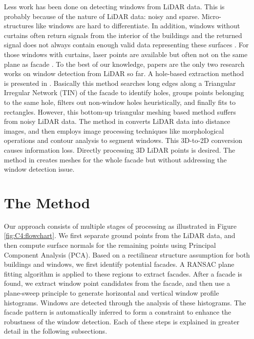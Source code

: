 Less work has been done on detecting windows from LiDAR data. This is probably because of the nature of LiDAR data: noisy and sparse. Micro-structures like windows are hard to differentiate. In addition, windows without curtains often return signals from the interior of the buildings and the returned signal does not always contain enough valid data representing these surfaces \cite{Pu07}. For those windows with curtains, laser points are available but often not on the same plane as facade \cite{Pu07}. To the best of our knowledge, papers \cite{Pu07, Ali08} are the only two research works on window detection from LiDAR so far. A hole-based extraction method is presented in \cite{Pu07}. Basically this method searches long edges along a Triangular Irregular Network (TIN) of the facade to identify holes, groups points belonging to the same hole, filters out non-window holes heuristically, and finally fits to rectangles. However, this bottom-up triangular meshing based method suffers from noisy LiDAR data. The method in \cite{Ali08} converts LiDAR data into distance images, and then employs image processing techniques like morphological operations and contour analysis to segment windows. This 3D-to-2D conversion causes information loss. Directly processing 3D LiDAR points is desired. The method in \cite{Frueh05} creates meshes for the whole facade but without addressing the window detection issue.

\section{The Method} 

Our approach consists of multiple stages of processing as illustrated in Figure \ref {fig:C4:flowchart}. We first separate ground points from the LiDAR data, and then compute surface normals for the remaining points using Principal Component Analysis (PCA). Based on a rectilinear structure assumption for both buildings and windows, we first identify potential facades. A RANSAC plane fitting algorithm is applied to these regions to extract facades. After a facade is found, we extract window point candidates from the facade, and then use a plane-sweep principle to generate horizontal and vertical window profile histograms. Windows are detected through the analysis of these histograms. The facade pattern is automatically inferred to form a constraint to enhance the robustness of the window detection. Each of these steps is explained in greater detail in the following subsections. 

